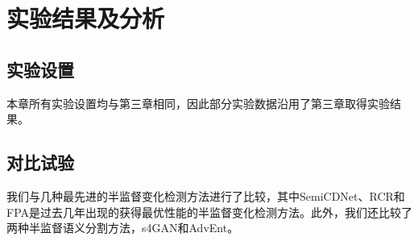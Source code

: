 \documentclass[lang=chs, degree=master, blindreview=false, adobe=false]{yanputhesis}
\begin{document}
\section{实验结果及分析}
\subsection{实验设置}
本章所有实验设置均与第三章相同，因此部分实验数据沿用了第三章取得实验结果。
\subsection{对比试验}
我们与几种最先进的半监督变化检测方法进行了比较，其中SemiCDNet\cite{peng2021SemiCDNet}、RCR\cite{bandara2022RCR}和FPA\cite{Zhang2023FPA}是过去几年出现的获得最优性能的半监督变化检测方法。此外，我们还比较了两种半监督语义分割方法，s4GAN\cite{mittal2019semi}和AdvEnt\cite{vu2019advent}。
\end{document}
